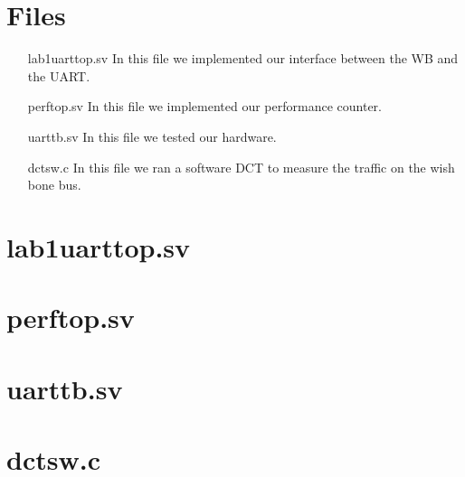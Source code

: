 \documentclass[a4paper]{article}
\begin{document}
\section{Files}
\begin{itemize}
	\item [lab1uarttop.sv] In this file we implemented our interface between the WB and the UART.
	\item [perftop.sv] In this file we implemented our performance counter.
	\item [uarttb.sv] In this file we tested our hardware.
	\item [dctsw.c] In this file we ran a software DCT to measure the traffic on the wish bone bus.
\end{itemize}



\newpage
\begin{appendices}
\begin{changemargin}{-3cm}{-3cm}

\section{lab1uarttop.sv}

\newpage
\section{perftop.sv}

\newpage
\section{uarttb.sv}

\newpage
\section{dctsw.c}

\end{changemargin}
\end{appendices}
\end{document}
